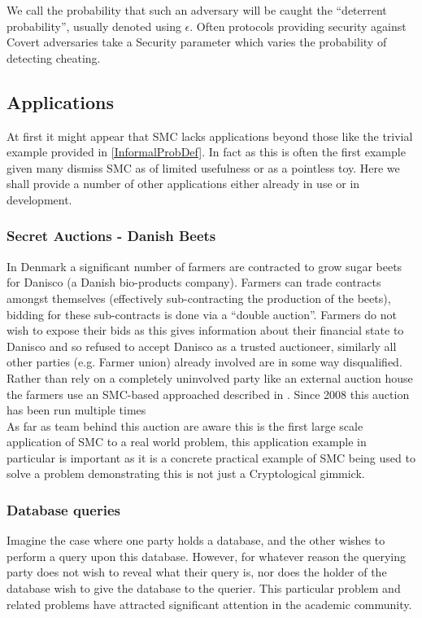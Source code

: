 \documentclass[a4paper,10pt]{article}
\begin{document}
				We call the probability that such an adversary will be caught the ``deterrent probability'', usually denoted using $\epsilon$. Often protocols providing security against Covert adversaries take a Security parameter which varies the probability of detecting cheating.


		\subsection{Applications} \label{Applications}
			At first it might appear that SMC lacks applications beyond those like the trivial example provided in \ref{InformalProbDef}. In fact as this is often the first example given many dismiss SMC as of limited usefulness or as a pointless toy. Here we shall provide a number of other applications either already in use or in development.


			\subsubsection{Secret Auctions - Danish Beets} \label{BeetsAuctionApplication}
				In Denmark a significant number of farmers are contracted to grow sugar beets for Danisco (a Danish bio-products company). Farmers can trade contracts amongst themselves (effectively sub-contracting the production of the beets), bidding for these sub-contracts is done via a ``double auction''. Farmers do not wish to expose their bids as this gives information about their financial state to Danisco and so refused to accept Danisco as a trusted auctioneer, similarly all other parties (e.g. Farmer union) already involved are in some way disqualified. Rather than rely on a completely uninvolved party like an external auction house the farmers use an SMC-based approached described in \cite{SugarBeets}. Since 2008 this auction has been run multiple times \\

				As far as team behind this auction are aware this is the first large scale application of SMC to a real world problem, this application example in particular is important as it is a concrete practical example of SMC being used to solve a problem demonstrating this is not just a Cryptological gimmick.

			\subsubsection{Database queries} \label{LegalDatabaseApplication}
				Imagine the case where one party holds a database, and the other wishes to perform a query upon this database. However, for whatever reason the querying party does not wish to reveal what their query is, nor does the holder of the database wish to give the database to the querier. This particular problem and related problems have attracted significant attention in the academic community.
\end{document}
